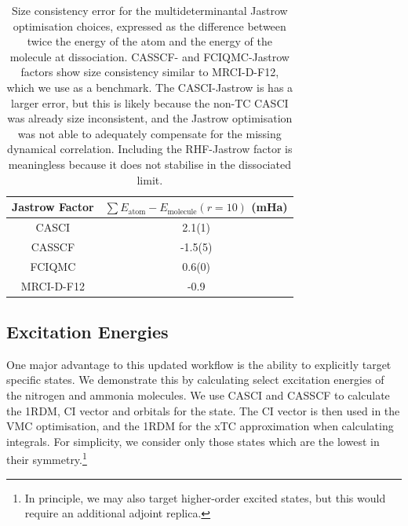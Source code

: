 \begin{table}[!h]
    \centering
    \begin{tabular}{c|c}
        Jastrow Factor & $\sum E_\mathrm{atom} - E_\mathrm{molecule}(r=10)$ (mHa) \\
        \hline
        CASCI & 2.1(1) \\
        CASSCF & -1.5(5) \\
        FCIQMC & 0.6(0) \\
        \bottomrule
        MRCI-D-F12 & -0.9
    \end{tabular}
    \caption{Size consistency error for the multideterminantal Jastrow optimisation choices, expressed as the difference between twice the energy of the atom and the energy of the molecule at dissociation. CASSCF- and FCIQMC-Jastrow factors show size consistency similar to MRCI-D-F12, which we use as a benchmark. The CASCI-Jastrow is has a larger error, but this is likely because the non-TC CASCI was already size inconsistent, and the Jastrow optimisation was not able to adequately compensate for the missing dynamical correlation. Including the RHF-Jastrow factor is meaningless because it does not stabilise in the dissociated limit.  }
    \label{tbl:size-consistency}
\end{table}


\subsection{Excitation Energies}

One major advantage to this updated workflow is the ability to explicitly target specific states. We demonstrate this by calculating select excitation energies of the nitrogen and ammonia molecules. We use CASCI and CASSCF to calculate the 1RDM, CI vector and orbitals for the state. The CI vector is then used in the VMC optimisation, and the 1RDM for the xTC approximation when calculating integrals. For simplicity, we consider only those states which are the lowest in their symmetry.\footnote{In principle, we may also target higher-order excited states, but this would require an additional adjoint replica.\supercite{bluntExcitedstateApproachFull2015}}


